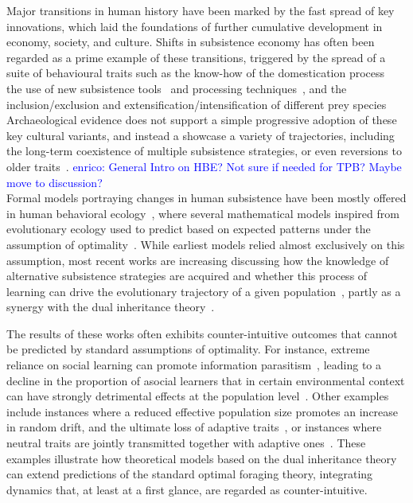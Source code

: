 \documentclass[preprint,authoryear]{elsarticle}
\newcommand{\memo}[2]{\textcolor{#1}{#2}}
\newcommand{\enrico}[1]{\memo{blue}{enrico: #1\\}}
\begin{document}
Major transitions in human history have been marked by the fast spread of key innovations, which laid the foundations of further cumulative development in economy, society, and culture. Shifts in subsistence economy has often been regarded as a prime example of these transitions, triggered by the spread of a suite of behavioural traits such as the know-how of the domestication process~\citep{barker2006} the use of new subsistence tools~\citep{petraglia_population_2009} and processing techniques~\citep{molleson1993}, and the inclusion/exclusion and extensification/intensification of different prey species %
Archaeological evidence does not support a simple progressive adoption of these key cultural variants, and instead a showcase a variety of trajectories, including the long-term coexistence of multiple subsistence strategies, or even reversions to older traits~\citep{rowley2001}.  
\enrico{General Intro on HBE? Not sure if needed for TPB? Maybe move to discussion?}
Formal models portraying changes in human subsistence have been mostly offered in human behavioral ecology~\citep{smith1992,bird2006,kennett2006}, where several mathematical models inspired from evolutionary ecology %
 used to predict  based on expected patterns under the assumption of optimality~\citep{belovsky1988}. 
While earliest models relied almost exclusively on this assumption, most recent works are increasing discussing how the knowledge of alternative subsistence strategies are acquired %
and whether this process of learning can drive the evolutionary trajectory of a given population~\citep{henrich1998}, partly as a synergy with the dual inheritance theory~\citep{boyd1985}. 

The results of these works often exhibits counter-intuitive outcomes that cannot be predicted by standard assumptions of optimality. For instance, extreme reliance on social learning can promote information parasitism~\citep{giraldeau2002}, leading to a decline in the proportion of asocial learners that in certain environmental context can have strongly detrimental effects at the population level~\citep{whitehead2009}. Other examples include instances where a reduced effective population size promotes an increase in random drift, and the ultimate loss of adaptive traits~\citep{henrich2004}, or instances where neutral traits are jointly transmitted together with adaptive ones~\citep{ackland2007}. These examples illustrate how theoretical models based on the dual inheritance theory can extend predictions of the standard optimal foraging theory, integrating dynamics that, at least at a first glance, are regarded as counter-intuitive. 
\end{document}

